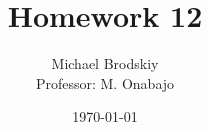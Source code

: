 


\title{Homework 12}
\date{\today}
\author{Michael Brodskiy\\ \small Professor: M. Onabajo}



\maketitle

